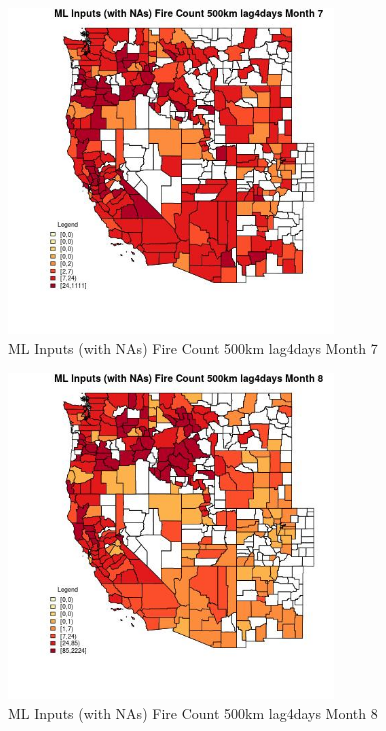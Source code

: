 \begin{figure} 
\centering  
\includegraphics[width=0.77\textwidth]{Code_Outputs/Report_ML_input_PM25_Step4_part_e_de_duplicated_aves_compiled_2019-05-21wNAs_CountyFire_Count_500km_lag4daysmedianMonth7.jpg} 
\caption{\label{fig:Report_ML_input_PM25_Step4_part_e_de_duplicated_aves_compiled_2019-05-21wNAsCountyFire_Count_500km_lag4daysmedianMonth7}ML Inputs (with NAs) Fire Count 500km lag4days Month 7} 
\end{figure} 
 

\begin{figure} 
\centering  
\includegraphics[width=0.77\textwidth]{Code_Outputs/Report_ML_input_PM25_Step4_part_e_de_duplicated_aves_compiled_2019-05-21wNAs_CountyFire_Count_500km_lag4daysmedianMonth8.jpg} 
\caption{\label{fig:Report_ML_input_PM25_Step4_part_e_de_duplicated_aves_compiled_2019-05-21wNAsCountyFire_Count_500km_lag4daysmedianMonth8}ML Inputs (with NAs) Fire Count 500km lag4days Month 8} 
\end{figure} 
 

